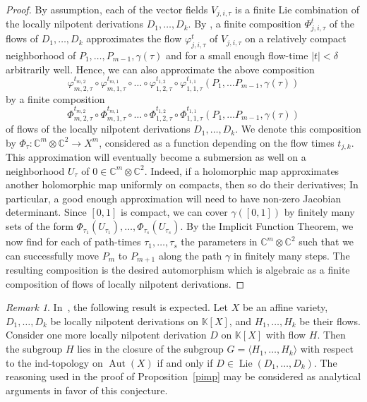 \documentclass[a4paper,draft,reqno,12pt]{amsart}
\theoremstyle{definition}
\theoremstyle{remark}
\newtheorem {remark}[theorem]{Remark}
\DeclareMathOperator{\lie}{Lie}
\DeclareMathOperator{\Aut}{Aut}
\def\CC{{\mathbb C}}
\def\KK{{\mathbb K}}
\begin{document}
\begin{proof}
By assumption, each of the vector fields $V_{j,i,\tau}$ is a finite Lie combination of the locally nilpotent derivations $D_1,\ldots, D_k$. By \cite[Corollary~4.8.4]{For}, a finite composition $\Phi_{j,i,\tau}^t$ of the flows of 
$D_1, \ldots, D_k$ approximates the flow $\varphi_{j,i,\tau}^t$ of $V_{j,i,\tau}$ on a relatively compact neighborhood of $P_1, \dots, P_{m-1}, \gamma(\tau)$ and for a small enough flow-time $|t| < \delta$ arbitrarily well. Hence, we can also approximate the above composition 
$$
\varphi_{m,2,\tau}^{t_{m,2}} \circ \varphi_{m,1,\tau}^{t_{m,1}} \circ \dots \circ \varphi_{1,2,\tau}^{t_{1,2}} \circ \varphi_{1,1,\tau}^{t_{1,1}}(P_1, \dots P_{m-1}, \gamma(\tau))
$$ 
by a finite composition 
$$
\Phi_{m,2,\tau}^{t_{m,2}} \circ \Phi_{m,1,\tau}^{t_{m,1}} \circ \dots \circ \Phi_{1,2,\tau}^{t_{1,2}} \circ \Phi_{1,1,\tau}^{t_{1,1}}(P_1, \dots P_{m-1}, \gamma(\tau))
$$ 
of flows of the locally nilpotent derivations $D_1, \ldots, D_k$. We denote this composition by $\Phi_{\tau} \colon \CC^{m} \otimes \CC^{2} \to X^m$, considered as a function depending on the flow times $t_{j,k}$. This approximation will eventually become a submersion as well on a neighborhood $U_\tau$ of ${0 \in \CC^{m} \otimes \CC^{2}}$. Indeed, if a holomorphic map approximates another holomorphic map uniformly on compacts, then so do their derivatives; In particular, a good enough approximation will need to have non-zero Jacobian determinant. Since $[0,1]$ is compact, we can cover $\gamma([0,1])$ by finitely many sets of the form $\Phi_{\tau_1}(U_{\tau_1}), \dots, \Phi_{\tau_s}(U_{\tau_s})$. By the Implicit Function Theorem, we now find for each of path-times $\tau_1, \dots, \tau_s$ the parameters in $\CC^m \otimes \CC^2$ such that we can successfully move $P_m$ to $P_{m+1}$ along the path $\gamma$ in finitely many steps. The resulting composition is the desired automorphism which is algebraic as a finite composition of flows of locally nilpotent derivations. 
\end{proof} 

\begin{remark}
In~\cite[Conjecture~5.23]{AKZ}, the following result is expected. Let $X$ be an affine variety, $D_1,\ldots,D_k$ be locally nilpotent derivations on $\KK[X]$, and $H_1,\ldots,H_k$ be their flows. Consider one more locally nilpotent derivation $D$ on $\KK[X]$ with flow $H$. Then the subgroup $H$ lies in the closure of the subgroup $G=\langle H_1,\ldots,H_k\rangle$  with respect to the ind-topology on $\Aut(X)$ if and only if $D\in\lie(D_1,\ldots,D_k)$. The reasoning used in the proof of Proposition~\ref{pimp} may be considered as analytical arguments in favor of this conjecture.
\end{remark}
\end{document}
